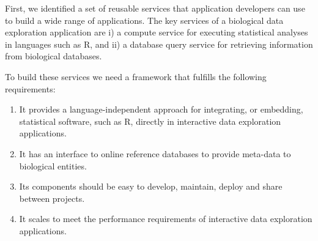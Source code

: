 
First, we identified a set of reusable services that application developers can
use to build a wide range of applications. The key services of a biological data
exploration application are i) a compute service for executing statistical
analyses in languages such as R, and ii) a database query service for retrieving
information from biological databases.

To build these services we need a framework that fulfills the following
requirements: 

\begin{enumerate}
    \item It provides a language-independent approach for integrating, or
        embedding, statistical software, such as R, directly in 
        interactive data
        exploration applications.
    \item It has an interface to online reference databases to provide meta-data to
        biological entities. %
    \item Its components should be easy to develop, maintain, deploy and share
        between projects. 
    \item It scales to meet the performance requirements of interactive data
        exploration applications. 
\end{enumerate} 
